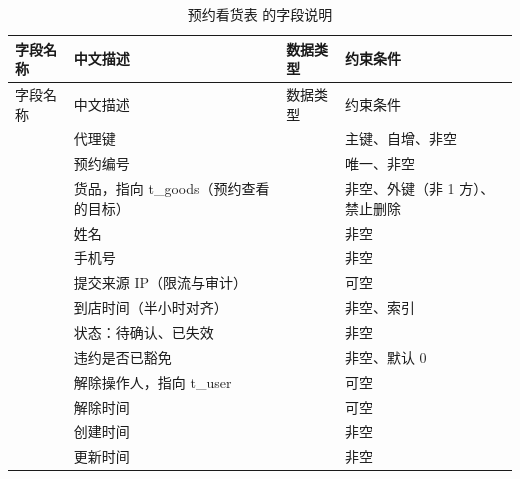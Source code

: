\begin{longtable}{@{}L{3.5cm} L{4.1cm} L{2.9cm} L{4.0cm}@{}}
\caption{预约看货表  的字段说明}\label{tab:f-t-reservation}\\
\toprule
字段名称 & 中文描述 & 数据类型 & 约束条件 \\
\midrule
\endfirsthead
\toprule
字段名称 & 中文描述 & 数据类型 & 约束条件 \\
\midrule
\endhead
\bottomrule
\endlastfoot
{} & 代理键 &  & 主键、自增、非空 \\
 & 预约编号 &  & 唯一、非空 \\
 & 货品，指向 t\_goods（预约查看的目标） &  & 非空、外键（非 1 方）、禁止删除 \\
 & 姓名 &  & 非空 \\
 & 手机号 &  & 非空 \\
 & 提交来源 IP（限流与审计） &  & 可空 \\
 & 到店时间（半小时对齐） &  & 非空、索引 \\
 & 状态：待确认、已失效 &  & 非空 \\
 & 违约是否已豁免 &  & 非空、默认 0 \\
 & 解除操作人，指向 t\_user &  & 可空 \\
 & 解除时间 &  & 可空 \\
 & 创建时间 &  & 非空 \\
 & 更新时间 &  & 非空 \\
\end{longtable}

